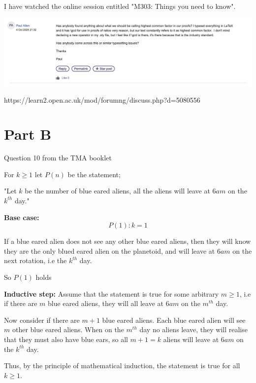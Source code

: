 \documentclass{tufte-handout}
\begin{document}
\begin{question}    

\qpart

I have watched the online session entitled "M303: Things you need to know".

\vspace{2cm}

    \qpart

    \includegraphics[scale=0.5]{question_8_b.jpg}

https://learn2.open.ac.uk/mod/forumng/discuss.php?d=5080556

\end{question}

\section{Part B}

\begin{question}
    Question 10 from the TMA booklet

    \qpart

    For \( k \geq 1 \) let \( P(n) \) be the statement;

"Let \( k \) be the number of blue eared aliens, all the aliens will leave at
\( 6am \) on the \( k^{th} \) day."

\vspace{5cm}

    \qpart

    \textbf{Base case:}
    \[ P(1): k = 1 \]

    If a blue eared alien does not see any other blue eared aliens, then they will know they are the only 
    blued eared alien on the planetoid, and will leave at \( 6am \) on the next rotation, i.e the \( k^{th} \) day.

So \( P(1) \) holds

    \textbf{Inductive step:}
    Assume that the statement is true for some arbitrary \( m \geq 1 \), i.e if there are \( m \) blue eared aliens, 
    they will all leave at \( 6am \) on the \( m^{th} \) day.

    Now consider if there are \( m + 1 \) blue eared aliens. Each blue eared alien will see \( m \) 
    other blue eared aliens. When on the \( m^{th} \) day no aliens leave, they will realise that they must also
    have blue ears, so all \( m + 1 = k \) aliens will leave at \( 6am \) on the \( k^{th} \) day.

    Thus, by the principle of mathematical induction, the statement is true for all \( k \geq 1 \).

\end{question}
\end{document}
